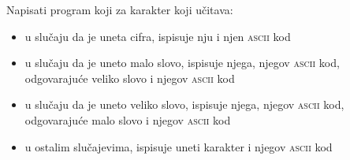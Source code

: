 \begin{Exercise}[label=v1.2_08] 
Napisati program koji za karakter koji učitava:
\begin{itemize}
\item{u slučaju da je uneta cifra, ispisuje nju i njen \textsc{ascii} kod} 
\item{u slučaju da je uneto malo slovo, ispisuje njega, njegov \textsc{ascii} kod, odgovarajuće veliko slovo i njegov \textsc{ascii} kod}
\item{u slučaju da je uneto veliko slovo, ispisuje njega, njegov \textsc{ascii} kod, odgovarajuće malo slovo i njegov \textsc{ascii} kod}
\item{u ostalim slučajevima, ispisuje uneti karakter i njegov \textsc{ascii} kod} 
\end{itemize}
\end{Exercise}
\begin{Answer}[ref=v1.2_08]
\end{Answer}


